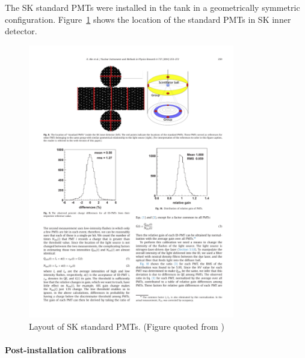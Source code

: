 The SK standard PMTs were installed in the tank in a geometrically symmetric configuration.
Figure~\ref{fig:sk_precalib_PMT_layout} shows the location of the standard PMTs
in SK inner detector.
\begin{figure}[htb]
  \centering
  \includegraphics[width=9cm]{figures/sk_precalib_PMT_layout.pdf}
  \caption{Layout of SK standard PMTs. (Figure quoted from \cite{SK_calib_paper})}
  \label{fig:sk_precalib_PMT_layout}
\end{figure}

\paragraph{Post-installation calibrations}

